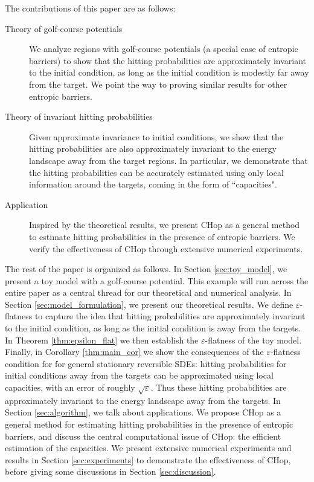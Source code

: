 \documentclass[english, aip, jcp, priprint, graphicx,floatfix]{revtex4-1}
\theoremstyle{plain}
\theoremstyle{definition}
\theoremstyle{plain}
\begin{document}
The contributions of this paper are as follows: 

\begin{description}
	\item[Theory of golf-course potentials] We analyze regions with golf-course potentials (a special case of entropic barriers) to show that the hitting probabilities are approximately invariant to the initial condition, as long as the initial condition is modestly far away from the target. We point the way to proving similar results for other entropic barriers.
	\item[Theory of invariant hitting probabilities] Given approximate invariance to initial conditions, we show that the hitting probabilities are also approximately invariant to the energy landscape away from the target regions. In particular, we demonstrate that the hitting probabilities can be accurately estimated using only local information around the targets, coming in the form of ``capacities".
	\item[Application] Inspired by the theoretical results, we present CHop as a general method to estimate hitting probabilities in the presence of entropic barriers. We verify the effectiveness of CHop through extensive numerical experiments.
\end{description}

The rest of the paper is organized as follows. In Section \ref{sec:toy_model}, we present a toy model with a golf-course potential.  This example will run across the entire paper as a central thread for our theoretical and numerical analysis. In Section \ref{sec:model_formulation}, we present our theoretical results. We define $\varepsilon$-flatness to capture the idea that hitting probabilities are approximately invariant to the initial condition, as long as the initial condition is away from the targets.  In Theorem \ref{thm:epsilon_flat} we then establish the $\varepsilon$-flatness of the toy model. Finally, in Corollary \ref{thm:main_cor} we show the consequences of the $\varepsilon$-flatness condition for for general stationary reversible SDEs: hitting probabilities for initial conditions away from the targets can be approximated using local capacities, with an error of roughly $\sqrt\varepsilon$.  Thus these hitting probabilities are approximately invariant to the energy landscape away from the targets.  In Section \ref{sec:algorithm}, we talk about applications. We propose CHop as a general method for estimating hitting probabilities in the presence of entropic barriers, and discuss the central computational issue of CHop: the efficient estimation of the capacities. We present extensive numerical experiments and results in Section \ref{sec:experiments} to demonstrate the effectiveness of CHop, before giving some discussions in Section \ref{sec:discussion}.
\end{document}
